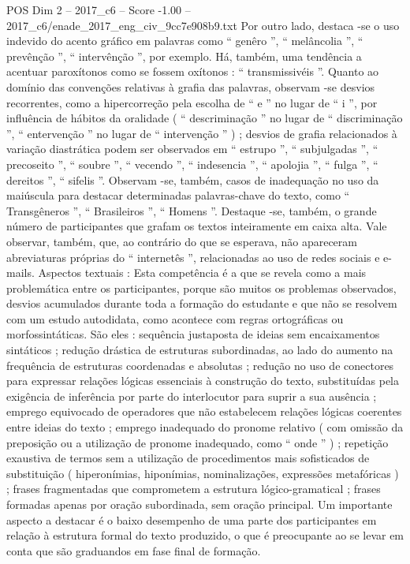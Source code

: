 \begin{textsample}{POS Dim 2 – 2017\_c6 – Score -1.00 – 2017\_c6/enade\_2017\_eng\_civ\_9cc7e908b9.txt}
Por outro lado, destaca -se o uso indevido do acento gráfico em palavras como “ genêro ”, “ melâncolia ”, “ prevênção ”, “ intervênção ”, por exemplo.
Há, também, uma tendência a acentuar paroxítonos como se fossem oxítonos : “ transmissivéis ”.
Quanto ao domínio das convenções relativas à grafia das palavras, observam -se desvios recorrentes, como a hipercorreção pela escolha de “ e ” no lugar de “ i ”, por influência de hábitos da oralidade ( “ descriminação ” no lugar de “ discriminação ”, “ entervenção ” no lugar de “ intervenção ” ) ; desvios de grafia relacionados à variação diastrática podem ser observados em “ estrupo ”, “ subjulgadas ”, “ precoseito ”, “ soubre ”, “ vecendo ”, “ indesencia ”, “ apolojia ”, “ fulga ”, “ dereitos ”, “ sifelis ”.
Observam -se, também, casos de inadequação no uso da maiúscula para destacar determinadas palavras-chave do texto, como “ Transgêneros ”, “ Brasileiros ”, “ Homens ”.
Destaque -se, também, o grande número de participantes que grafam os textos inteiramente em caixa alta.
Vale observar, também, que, ao contrário do que se esperava, não apareceram abreviaturas próprias do “ internetês ”, relacionadas ao uso de redes sociais e e-mails.
Aspectos textuais : Esta competência é a que se revela como a mais problemática entre os participantes, porque são muitos os problemas observados, desvios acumulados durante toda a formação do estudante e que não se resolvem com um estudo autodidata, como acontece com regras ortográficas ou morfossintáticas.
São eles : sequência justaposta de ideias sem encaixamentos sintáticos ; redução drástica de estruturas subordinadas, ao lado do aumento na frequência de estruturas coordenadas e absolutas ; redução no uso de conectores para expressar relações lógicas essenciais à construção do texto, substituídas pela exigência de inferência por parte do interlocutor para suprir a sua ausência ; emprego equivocado de operadores que não estabelecem relações lógicas coerentes entre ideias do texto ; emprego inadequado do pronome relativo ( com omissão da preposição ou a utilização de pronome inadequado, como “ onde ” ) ; repetição exaustiva de termos sem a utilização de procedimentos mais sofisticados de substituição ( hiperonímias, hiponímias, nominalizações, expressões metafóricas ) ; frases fragmentadas que comprometem a estrutura lógico-gramatical ; frases formadas apenas por oração subordinada, sem oração principal.
Um importante aspecto a destacar é o baixo desempenho de uma parte dos participantes em relação à estrutura formal do texto produzido, o que é preocupante ao se levar em conta que são graduandos em fase final de formação.

\end{textsample}
